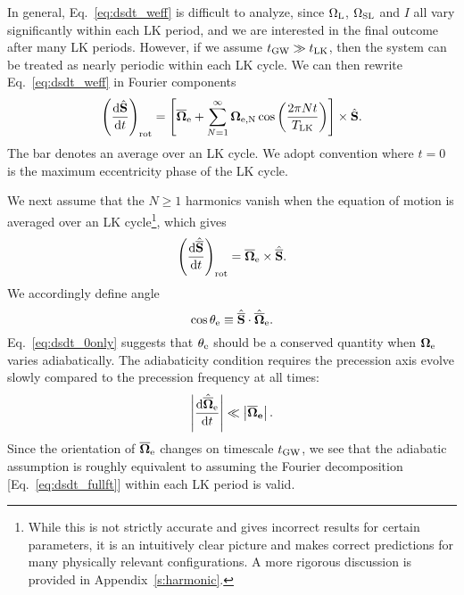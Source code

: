 \documentclass[
        fleqn,
        usenatbib,
    ]{mnras}
\newcommand*{\rd}[2]{\frac{\mathrm{d}#1}{\mathrm{d}#2}}
\newcommand*{\abs}[1]{\left|#1\right|}
\newcommand*{\bm}[1]{\boldsymbol{\mathbf{#1}}}
\newcommand*{\uv}[1]{\hat{\bm{#1}}}
\newcommand*{\p}[1]{\left(#1\right)}
\newcommand*{\s}[1]{\left[#1\right]}
\begin{document}
In general, Eq.~\eqref{eq:dsdt_weff} is difficult to analyze, since $\Omega_{\rm
L}$, $\Omega_{\rm SL}$ and $I$ all vary significantly within each LK period,
and we are interested in the final outcome after many LK periods. However, if we
assume $t_{\rm GW} \gg t_{\rm LK}$, then the system can be treated as nearly
periodic within each LK cycle. We can then rewrite Eq.~\eqref{eq:dsdt_weff} in
Fourier components
\begin{equation}
    \p{\rd{\uv{S}}{t}}_{\rm rot}
        = \s{\bm{\overline{\Omega}}_{\rm e} + \sum\limits_{N = 1}^\infty
            \bm{\Omega}_{\rm e, N}\cos \p{\frac{2\pi N t}{T_{\rm LK}}}}
            \times \uv{S}.\label{eq:dsdt_fullft}
\end{equation}
The bar denotes an average over an LK cycle. We adopt convention where $t = 0$
is the maximum eccentricity phase of the LK cycle.

We next assume that the $N \geq 1$ harmonics vanish when the equation of motion
is averaged over an LK cycle\footnote{While this is not strictly accurate and
gives incorrect results for certain parameters, it is an intuitively clear
picture and makes correct predictions for many physically relevant
configurations. A more rigorous discussion is provided in
Appendix~\ref{s:harmonic}.}, which gives
\begin{equation}
    \p{\rd{\uv{\overline{S}}}{t}}_{\rm rot}
        = \bm{\overline{\Omega}}_{\rm e}
            \times \uv{\overline{S}}.\label{eq:dsdt_0only}
\end{equation}
We accordingly define angle
\begin{equation}
    \cos \theta_{\rm e} \equiv
        \uv{\overline{S}} \cdot \uv{\overline{\Omega}}_{\rm e}.
        \label{eq:q_eff}
\end{equation}
Eq.~\eqref{eq:dsdt_0only} suggests that $\theta_{\rm e}$ should be a conserved
quantity when $\bm{\Omega}_{\rm e}$ varies adiabatically. The adiabaticity
condition requires the precession axis evolve slowly compared to the precession
frequency at all times:
\begin{equation}
    \abs{\rd{\uv{\overline{\Omega}}_{\rm e}}{t}} \ll
        \abs{\bm{\overline{\Omega}_{\rm e}}}. \label{eq:ad_constr}
\end{equation}
Since the orientation of $\bm{\overline{\Omega}}_{\rm e}$ changes on timescale
$t_{\rm GW}$, we see that the adiabatic assumption is roughly equivalent to
assuming the Fourier decomposition [Eq.~\eqref{eq:dsdt_fullft}] within each LK
period is valid.
\end{document}
